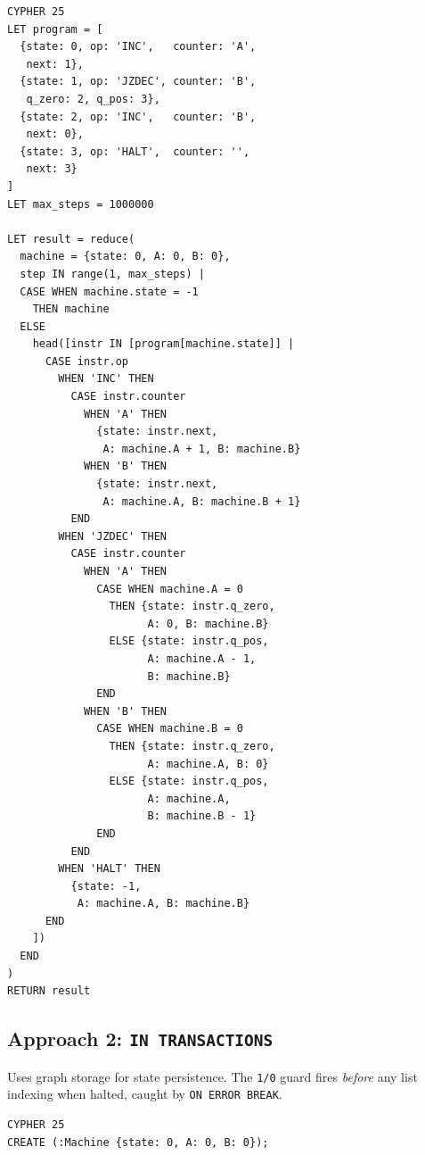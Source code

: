 \documentclass[sigconf, nonacm]{acmart}
\begin{document}
\begin{codeblock}
\begin{lstlisting}[style=cypher]
CYPHER 25
LET program = [
  {state: 0, op: 'INC',   counter: 'A',
   next: 1},
  {state: 1, op: 'JZDEC', counter: 'B',
   q_zero: 2, q_pos: 3},
  {state: 2, op: 'INC',   counter: 'B',
   next: 0},
  {state: 3, op: 'HALT',  counter: '',
   next: 3}
]
LET max_steps = 1000000

LET result = reduce(
  machine = {state: 0, A: 0, B: 0},
  step IN range(1, max_steps) |
  CASE WHEN machine.state = -1
    THEN machine
  ELSE
    head([instr IN [program[machine.state]] |
      CASE instr.op
        WHEN 'INC' THEN
          CASE instr.counter
            WHEN 'A' THEN
              {state: instr.next,
               A: machine.A + 1, B: machine.B}
            WHEN 'B' THEN
              {state: instr.next,
               A: machine.A, B: machine.B + 1}
          END
        WHEN 'JZDEC' THEN
          CASE instr.counter
            WHEN 'A' THEN
              CASE WHEN machine.A = 0
                THEN {state: instr.q_zero,
                      A: 0, B: machine.B}
                ELSE {state: instr.q_pos,
                      A: machine.A - 1,
                      B: machine.B}
              END
            WHEN 'B' THEN
              CASE WHEN machine.B = 0
                THEN {state: instr.q_zero,
                      A: machine.A, B: 0}
                ELSE {state: instr.q_pos,
                      A: machine.A,
                      B: machine.B - 1}
              END
          END
        WHEN 'HALT' THEN
          {state: -1,
           A: machine.A, B: machine.B}
      END
    ])
  END
)
RETURN result
\end{lstlisting}
\end{codeblock}

\subsection{Approach 2: \texttt{IN TRANSACTIONS}}

Uses graph storage for state persistence.
The \texttt{1/0} guard fires \emph{before} any list indexing when
halted, caught by \texttt{ON ERROR BREAK}.

\begin{codeblock}
\begin{lstlisting}[style=cypher]
CYPHER 25
CREATE (:Machine {state: 0, A: 0, B: 0});
\end{lstlisting}
\end{codeblock}
\end{document}
